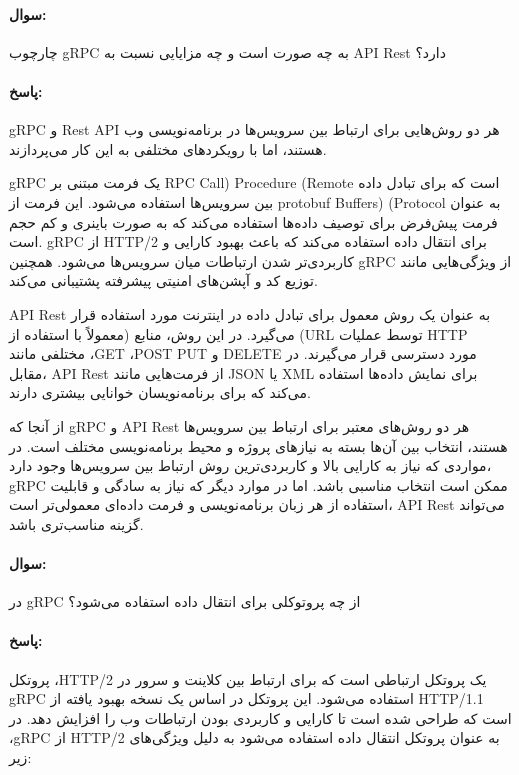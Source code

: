 \documentclass[a4paper,10pt]{article}
\begin{document}
    \paragraph{سوال:} چارچوب gRPC به چه صورت است و چه مزایایی نسبت به API Rest دارد؟

    \paragraph{پاسخ:} gRPC و Rest API هر دو روش‌هایی برای ارتباط بین سرویس‌ها در برنامه‌نویسی وب هستند، اما با رویکردهای مختلفی به این کار می‌پردازند.

    gRPC یک فرمت مبتنی بر RPC Call) Procedure (Remote است که برای تبادل داده بین سرویس‌ها استفاده می‌شود. این فرمت از protobuf Buffers) (Protocol به عنوان فرمت پیش‌فرض برای توصیف داده‌ها استفاده می‌کند که به صورت باینری و کم حجم است. gRPC از HTTP/2 برای انتقال داده استفاده می‌کند که باعث بهبود کارایی و کاربردی‌تر شدن ارتباطات میان سرویس‌ها می‌شود. همچنین gRPC از ویژگی‌هایی مانند توزیع کد و آپشن‌های امنیتی پیشرفته پشتیبانی می‌کند.
    
    API Rest به عنوان یک روش معمول برای تبادل داده در اینترنت مورد استفاده قرار می‌گیرد. در این روش، منابع (معمولاً با استفاده از (URL توسط عملیات HTTP مختلفی مانند ،GET ،POST PUT و DELETE مورد دسترسی قرار می‌گیرند. در مقابل، API Rest از فرمت‌هایی مانند JSON یا XML برای نمایش داده‌ها استفاده می‌کند که برای برنامه‌نویسان خوانایی بیشتری دارند.
    
    از آنجا که gRPC و API Rest هر دو روش‌های معتبر برای ارتباط بین سرویس‌ها هستند، انتخاب بین آن‌ها بسته به نیازهای پروژه و محیط برنامه‌نویسی مختلف است. در مواردی که نیاز به کارایی بالا و کاربردی‌ترین روش ارتباط بین سرویس‌ها وجود دارد، gRPC ممکن است انتخاب مناسبی باشد. اما در موارد دیگر که نیاز به سادگی و قابلیت استفاده از هر زبان برنامه‌نویسی و فرمت داده‌ای معمولی‌تر است، API Rest می‌تواند گزینه مناسب‌تری باشد.

    \noindent\hrulefill

    \paragraph{سوال:} در gRPC از چه پروتوکلی برای انتقال داده استفاده می‌شود؟

    \paragraph{پاسخ:} پروتکل ،HTTP/2 یک پروتکل ارتباطی است که برای ارتباط بین کلاینت و سرور در gRPC استفاده می‌شود. این پروتکل در اساس یک نسخه بهبود یافته از HTTP/1.1 است که طراحی شده است تا کارایی و کاربردی بودن ارتباطات وب را افزایش دهد. در ،gRPC از HTTP/2 به عنوان پروتکل انتقال داده استفاده می‌شود به دلیل ویژگی‌های زیر:
\end{document}
